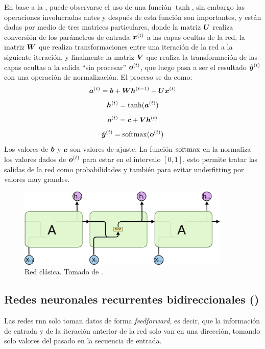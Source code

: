En base a la , puede observarse el uso de una función $\tanh$, sin embargo las operaciones involucradas antes y después de esta función son importantes, y están dadas por medio de tres matrices particulares, donde la matriz ${\bm{U}}$ realiza conversión de los parámetros de entrada ${\bm{x}}^{(t)}$ a las capas ocultas de la red, la matriz ${\bm{W}}$ que realiza transformaciones entre una iteración de la red a la siguiente iteración, y finalmente la matriz ${\bm{V}}$ que realiza la transformación de las capas ocultas a la salida ``sin procesar'' ${\bm{o}}^{(t)}$, que luego pasa a ser el resultado $\hat{{\bm{y}}}^{(t)}$ con una operación de normalización. El proceso se da como:
\begin{equation}
  {\bm{a}}^{(t)} = {\bm{b}} + {\bm{W}} {\bm{h}}^{(t-1)} + {\bm{U}} {\bm{x}}^{(t)}
\end{equation}
\begin{equation}
  {\bm{h}}^{(t)} = \tanh({\bm{a}}^{(t)})
\end{equation}
\begin{equation}
  {\bm{o}}^{(t)} = {\bm{c}} + {\bm{V}} {\bm{h}}^{(t)}
\end{equation}
\begin{equation} \label{eq:rnn-softmax-output}
  \hat{{\bm{y}}}^{(t)} = \mathrm{softmax}({\bm{o}}^{(t)})
\end{equation}
Los valores de ${\bm{b}}$ y ${\bm{c}}$ son valores de ajuste. La función $\mathrm{softmax}$ en la  normaliza los valores dados de ${\bm{o}}^{(t)}$ para estar en el intervalo $[0, 1]$, esto permite tratar las salidas de la red como probabilidades y también para evitar \gls{underfitting} por valores muy grandes.

\begin{figure}[H]
  \centering
  \includegraphics[width=0.9\textwidth]{Figures/LSTM3-SimpleRNN.png}
\decoRule
\caption[Red  clásica]{Red  clásica. Tomado de \cite{understanding-lstm}.}
\label{fig:rnn-classic}
\end{figure}

\subsection{Redes neuronales recurrentes bidireccionales ()}
Las redes \gls{rnn} solo toman datos de forma \textsl{feedforward}, es decir, que la información de entrada y de la iteración anterior de la red solo van en una dirección, tomando solo valores del pasado en la secuencia de entrada.

